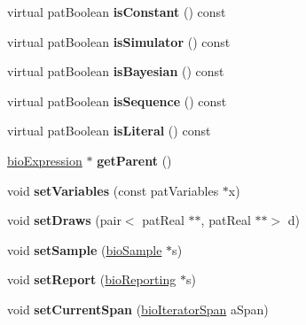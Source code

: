 \begin{DoxyCompactItemize}
virtual pat\+Boolean {\bfseries is\+Constant} () const
\item 
\mbox{\label{classbio_expression_a694d7224922cdcee2f297d6cd2c7e7c3}} 
virtual pat\+Boolean {\bfseries is\+Simulator} () const
\item 
\mbox{\label{classbio_expression_a5f0826b2b3968d0c07aae8487abc558d}} 
virtual pat\+Boolean {\bfseries is\+Bayesian} () const
\item 
\mbox{\label{classbio_expression_aa7ad5b57139159b4d16c006dd189d17c}} 
virtual pat\+Boolean {\bfseries is\+Sequence} () const
\item 
\mbox{\label{classbio_expression_a678590f7b79e457e52765cc91c8e49db}} 
virtual pat\+Boolean {\bfseries is\+Literal} () const
\item 
\mbox{\label{classbio_expression_a6f5cbab7d011a820b37688656ad63b2b}} 
\hyperlink{classbio_expression}{bio\+Expression} $\ast$ {\bfseries get\+Parent} ()
\item 
\mbox{\label{classbio_expression_a8e24ba3bb14cb6b2dc38fb7d598adeff}} 
void {\bfseries set\+Variables} (const pat\+Variables $\ast$x)
\item 
\mbox{\label{classbio_expression_a5ddcd75de93b042d8504cac9d20ae4a9}} 
void {\bfseries set\+Draws} (pair$<$ pat\+Real $\ast$$\ast$, pat\+Real $\ast$$\ast$$>$ d)
\item 
\mbox{\label{classbio_expression_a0268a423696c0ae260c2a73d05dee49e}} 
void {\bfseries set\+Sample} (\hyperlink{classbio_sample}{bio\+Sample} $\ast$s)
\item 
\mbox{\label{classbio_expression_a75f443dfed7ac177d36b1c410381fcfd}} 
void {\bfseries set\+Report} (\hyperlink{classbio_reporting}{bio\+Reporting} $\ast$s)
\item 
\mbox{\label{classbio_expression_a59845161d138486d86da07ac6b49d177}} 
void {\bfseries set\+Current\+Span} (\hyperlink{classbio_iterator_span}{bio\+Iterator\+Span} a\+Span)
$$
\end{DoxyCompactItemize}
